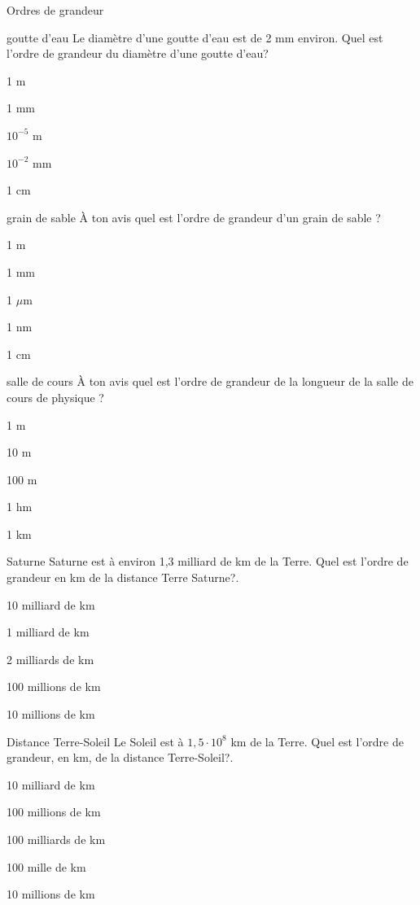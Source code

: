 \documentclass[12pt]{article}
\begin{document}
\begin{quiz}{Ordres de grandeur}
\begin{multi}[points=1]{goutte d'eau}
Le diamètre d'une goutte d'eau est de 2 mm environ. Quel est l'ordre de grandeur du diamètre d'une goutte d'eau?
\item 1 m
\item   * 1 mm
\item $10^{-5}$ m
\item $10^{-2}$ mm
\item 1 cm
\end{multi}

\begin{multi}[points=1]{grain de sable}
À ton avis quel est l'ordre de grandeur d'un grain de sable ? 
\item 1 m
\item   * 1 mm
\item 1 $\mu$m
\item 1 nm
\item 1 cm
\end{multi}

\begin{multi}[points=1]{salle de cours}
À ton avis quel est l'ordre de grandeur de la longueur de la salle de cours de physique ?
\item 1 m
\item   * 10 m
\item 100 m
\item 1 hm
\item 1 km
\end{multi}

\begin{multi}[points=1]{Saturne}
Saturne est à environ 1,3 milliard de km de la Terre. Quel est l'ordre de grandeur en km de la distance Terre Saturne?.
\item 10 milliard de km
\item   * 1 milliard de km
\item 2 milliards de km
\item 100 millions de km
\item 10 millions de km
\end{multi}

\begin{multi}[points=1]{Distance Terre-Soleil}
Le Soleil est à $1,5\cdot10^8$ km de la Terre. Quel est l'ordre de grandeur, en km, de la distance Terre-Soleil?.
\item 10 milliard de km
\item   * 100 millions de km
\item 100 milliards de km
\item 100 mille de km
\item 10 millions de km
\end{multi}


\end{quiz}
\end{document}

